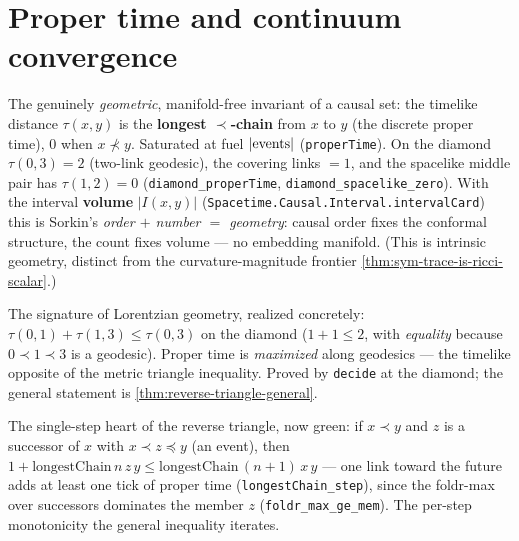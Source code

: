 \section{Proper time and continuum convergence}

\begin{theorem}\label{thm:proper-time-longest-chain}\leanok{}
The genuinely \emph{geometric}, manifold-free invariant of a causal set: the timelike distance
$\tau(x,y)$ is the \textbf{longest $\prec$-chain} from $x$ to $y$ (the discrete proper time), $0$ when
$x\not\prec y$. Saturated at fuel $|{\rm events}|$ (\texttt{properTime}). On the diamond
$\tau(0,3)=2$ (two-link geodesic), the covering links $=1$, and the spacelike middle pair has
$\tau(1,2)=0$ (\texttt{diamond\_properTime}, \texttt{diamond\_spacelike\_zero}). With the interval
\textbf{volume} $|I(x,y)|$ (\texttt{Spacetime.Causal.Interval.intervalCard}) this is Sorkin's \emph{order $+$
number $=$ geometry}: causal order fixes the conformal structure, the count fixes volume --- no
embedding manifold. (This is intrinsic geometry, distinct from the curvature-magnitude frontier
\cref{thm:sym-trace-is-ricci-scalar}.)
\end{theorem}

\begin{theorem}\label{thm:reverse-triangle-diamond}\leanok{}
The signature of Lorentzian geometry, realized concretely: $\tau(0,1)+\tau(1,3)\le\tau(0,3)$ on the
diamond ($1+1\le 2$, with \emph{equality} because $0\prec1\prec3$ is a geodesic). Proper time is
\emph{maximized} along geodesics --- the timelike opposite of the metric triangle inequality. Proved
by \texttt{decide} at the diamond; the general statement is \cref{thm:reverse-triangle-general}.
\end{theorem}

\begin{theorem}\label{thm:proper-time-step}\leanok{}
The single-step heart of the reverse triangle, now green: if $x\prec y$ and $z$ is a successor of $x$
with $x\prec z\preceq y$ (an event), then $1 + \mathrm{longestChain}\,n\,z\,y \le
\mathrm{longestChain}\,(n{+}1)\,x\,y$ --- one link toward the future adds at least one tick of proper
time (\texttt{longestChain\_step}), since the foldr-max over successors dominates the member $z$
(\texttt{foldr\_max\_ge\_mem}). The per-step monotonicity the general inequality iterates.
\end{theorem}

